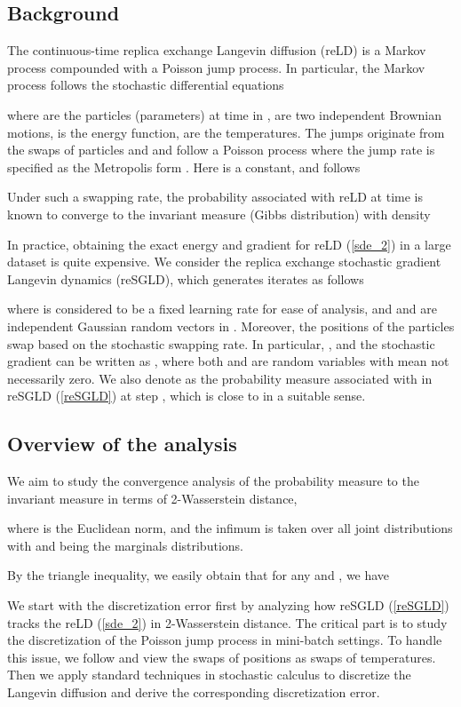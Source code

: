 
\subsection{Background}
The continuous-time replica exchange Langevin diffusion (reLD)  is a Markov process compounded with a Poisson jump process. In particular, the Markov process follows the stochastic differential equations

where  are the particles (parameters) at time  in ,  are two independent Brownian motions,  is the energy function,  are the temperatures. The jumps originate from the swaps of particles  and  and follow a Poisson process where the jump rate is specified as the Metropolis form . Here  is a constant, and  follows

Under such a swapping rate, the probability  associated with reLD at time  is known to converge to the invariant measure (Gibbs distribution) with density


In practice, obtaining the exact energy and gradient for reLD (\ref{sde_2}) in a large dataset is quite expensive. We consider the replica exchange stochastic gradient Langevin dynamics (reSGLD), which generates iterates  as follows

where  is considered to be a fixed learning rate for ease of analysis, and  and  are independent Gaussian random vectors in . Moreover, the positions of the particles swap based on the stochastic swapping rate. In particular, , and the stochastic gradient  can be written as , where both  and  are random variables with mean not necessarily zero. We also denote  as the probability measure associated with  in reSGLD (\ref{reSGLD}) at step , which is close to  in a suitable sense.


\subsection{Overview of the analysis}


We aim to study the convergence analysis of the probability measure  to the invariant measure  in terms of 2-Wasserstein distance,

where  is the Euclidean norm, and the infimum is taken over all joint distributions  with  and  being the marginals distributions.

By the triangle inequality, we easily obtain that for any  and , we have 

We start with the discretization error first by analyzing how reSGLD (\ref{reSGLD}) tracks the reLD (\ref{sde_2}) in 2-Wasserstein distance. The critical part is to study the discretization of the Poisson jump process in mini-batch settings. To handle this issue, we follow \citet{Paul12} and view the swaps of positions as swaps of temperatures. Then we apply standard techniques in stochastic calculus \citep{chen2018accelerating, yin_zhu_10, Issei14, Maxim17} to discretize the Langevin diffusion and derive the corresponding discretization error.



